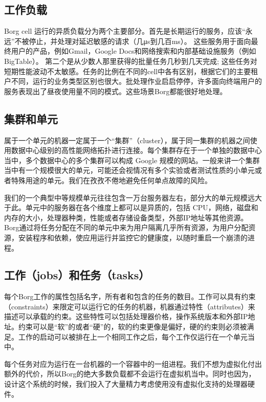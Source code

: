\subsection{工作负载}

Borg cell 运行的异质负载分为两个主要部分。首先是长期运行的服务，应该“永远”不被停止，并处理对延迟敏感的请求（几μs到几百ms）。 这些服务用于面向最终用户的产品，例如Gmail，Google Docs和网络搜索和内部基础设施服务（例如BigTable）。 第二个是从少数人那里获得的批量任务几秒到几天完成; 这些任务对短期性能波动不太敏感。任务的比例在不同的cell中各有区别，根据它们的主要租户不同，运行的业务类型区别也很大。批处理作业启启停停，许多面向终端用户的服务表现出了昼夜使用量不同的模式。这些场景Borg都能很好地处理。

\subsection{集群和单元}

属于一个单元的机器一定属于一个“集群”（cluster），属于同一集群的机器之间使用数据中心级别的高性能网络拓扑进行连接。每个集群存在于一个单独的数据中心当中，多个数据中心的多个集群可以构成 Google 规模的网站。一般来讲一个集群当中有一个规模很大的单元，可能还会视情况有多个实验或者测试性质的小单元或者特殊用途的单元。我们在孜孜不倦地避免任何单点故障的风险。

我们的一个典型中等规模单元往往包含一万台服务器左右，部分大的单元规模远大于此。单元中的服务器在各个维度上都可以是异质的，包括 CPU，网络，磁盘和内存的大小，处理器种类，性能或者存储设备类型，外部IP地址等其他资源。Borg通过将任务分配在不同的单元中来为用户隔离几乎所有资源，为用户分配资源，安装程序和依赖，使应用运行并监控它的健康度，以随时重启一个崩溃的进程。

\subsection{工作（jobs）和任务（tasks）}

每个Borg工作的属性包括名字，所有者和包含的任务的数目。工作可以具有约束（constraints）来限定可以运行它的任务的机器，机器通过特性（attributes）来描述可以承载的约束。这些特性可以包括处理器价格，操作系统版本和外部IP地址。约束可以是“软”的或者“硬”的，软的约束更像是偏好，硬的约束则必须被满足。工作的启动可以被排在上一个相同工作之后，每个工作仅运行在一个单元当中。

每个任务对应为运行在一台机器的一个容器中的一组进程。我们不想为虚拟化付出额外的代价，所以Borg的绝大多数负载都不会运行在虚拟机当中。同时也因为，设计这个系统的时候，我们投入了大量精力考虑使用没有虚拟化支持的处理器硬件。

